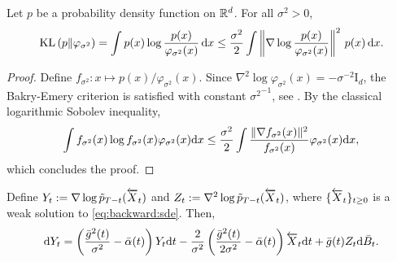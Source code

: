 \documentclass[english,graybox,envcountchap,envcountsame,sectrefs,shortlabels]{svmono}
\theoremstyle{style}
\newcommand{\eqsp}{}
\newcommand{\kl}{\mathrm{KL}}
\begin{document}
\begin{lemma}
\label{stam-gross}
Let $p$ be a probability density function on $\mathbb{R}^d$. For all $\sigma^2>0$,
    \begin{equation*}
\kl \left(p \| \gausspdf_{\sigma^2 }\right) = \int p(x) \log \frac{p(x)}{\gausspdf_{\sigma^2 }(x)} \, \rmd x \leq \frac{\sigma^2 }{2} \int \left\|\nabla \log \frac{p(x)}{\gausspdf_{\sigma^2 }(x)} \right\|^2 \, p(x) \, \rmd x.
\end{equation*}
\end{lemma}
\begin{proof}
 Define $f_{\sigma^2}:x\mapsto p(x)/\varphi_{\sigma^2}(x)$. Since $\nabla^2 \log \varphi_{\sigma^2}(x) = -\sigma^{-2} \mathrm{I}_d$, the  Bakry-Emery criterion is satisfied with constant ${\sigma^2}^{-1}$, see \cite{bakry2014analysis,villani2021topics,talagrand1996transportation}. By the classical  logarithmic Sobolev inequality,
\begin{align*}
\int f_{\sigma^2}(x)\log f_{\sigma^2}(x)\varphi_{\sigma^2}(x)\rmd x \leq \frac{{\sigma^2}}{2}\int \frac{\|\nabla f_{\sigma^2}(x)\|^2}{f_{\sigma^2}(x)}\varphi_{\sigma^2}(x)\rmd x\eqsp,
\end{align*}
which concludes the proof.
\end{proof}

\begin{lemma} \label{score differential form}
 Define $Y_t := \nabla \log \tilde p_{T-t} (\overleftarrow X_t)$ and  $Z_t := \nabla^2 \log \tilde p_{T-t} (\overleftarrow X_t)$, where $\{\overleftarrow X_t\}_{t\geq 0}$ is a weak solution to \eqref{eq:backward:sde}. Then, 
\begin{align}\label{eq:SDE_for_Y}
    \rmd Y_t = \left( \frac{\bar g^2(t)}{\sigma^2} - \bar \alpha(t) \right) Y_t \rmd t - \frac{2}{\sigma^2} \left( \frac{\bar g^2(t)}{2 \sigma^2} - \bar \alpha(t) \right) \ola X_t \rmd t + \bar g(t) Z_t \rmd \bar B_t\eqsp.
\end{align}
\end{lemma}
\end{document}
